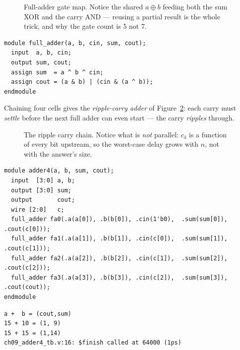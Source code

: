 \begin{figure}[htbp]
\centering

\caption{Full-adder gate map. Notice the shared $a\oplus b$ feeding both
the sum XOR and the carry AND — reusing a partial result is the whole
trick, and why the gate count is 5 not 7.}
\label{fig:fulladder}
\end{figure}

\begin{lstlisting}[caption={\ttfamily code/ch09\_full\_adder.v --- the
cell the ripple reuses.},label={lst:fa},abovecaptionskip=0pt]
module full_adder(a, b, cin, sum, cout);
  input  a, b, cin;
  output sum, cout;
  assign sum  = a ^ b ^ cin;
  assign cout = (a & b) | (cin & (a ^ b));
endmodule
\end{lstlisting}

Chaining four cells gives the \emph{ripple-carry
adder} of Figure~\ref{fig:ripple}: each carry
must \emph{settle} before the next full adder can even start — the carry
\emph{ripples} through.

\begin{figure}[htbp]
\centering

\caption{The ripple carry chain. Notice what is \emph{not} parallel:
$c_4$ is a function of every bit upstream, so the worst-case delay grows
with $n$, not with the answer's size.}
\label{fig:ripple}
\end{figure}

\begin{lstlisting}[caption={\ttfamily code/ch09\_adder4.v + its
testbench --- the 4-cell chain, exercised.},label={lst:adder4},abovecaptionskip=0pt]
module adder4(a, b, sum, cout);
  input  [3:0] a, b;
  output [3:0] sum;
  output       cout;
  wire [2:0]   c;
  full_adder fa0(.a(a[0]), .b(b[0]), .cin(1'b0),  .sum(sum[0]), .cout(c[0]));
  full_adder fa1(.a(a[1]), .b(b[1]), .cin(c[0]),  .sum(sum[1]), .cout(c[1]));
  full_adder fa2(.a(a[2]), .b(b[2]), .cin(c[1]),  .sum(sum[2]), .cout(c[2]));
  full_adder fa3(.a(a[3]), .b(b[3]), .cin(c[2]),  .sum(sum[3]), .cout(cout));
endmodule
\end{lstlisting}

\begin{lstlisting}[caption={Last rows of the real \texttt{vvp} output ---
carry out asserted at 15+5, 15+10, 15+15.},abovecaptionskip=0pt]
 a +  b = (cout,sum)
15 + 10 = (1, 9)
15 + 15 = (1,14)
ch09_adder4_tb.v:16: $finish called at 64000 (1ps)
\end{lstlisting}


